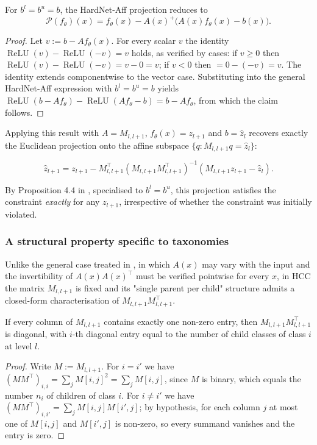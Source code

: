 \begin{proposition}
For $b^l=b^u=b$, the HardNet-Aff projection reduces to
\[
\mathcal{P}(f_\theta)(x)=f_\theta(x)-A(x)^{+}\big(A(x)f_\theta(x)-b(x)\big).
\]
\end{proposition}
\begin{proof}
Let $v:=b-Af_\theta(x)$. For every scalar $v$ the identity $\operatorname{ReLU}(v)-\operatorname{ReLU}(-v)=v$ holds, as verified by cases: if $v\ge 0$ then $\operatorname{ReLU}(v)-\operatorname{ReLU}(-v)=v-0=v$; if $v<0$ then $=0-(-v)=v$. The identity extends componentwise to the vector case. Substituting into the general HardNet-Aff expression with $b^l=b^u=b$ yields $\operatorname{ReLU}(b-Af_\theta)-\operatorname{ReLU}(Af_\theta-b)=b-Af_\theta$, from which the claim follows.
\end{proof}

Applying this result with $A=M_{l,l+1}$, $f_\theta(x)=z_{l+1}$ and $b=\hat z_l$ recovers exactly the Euclidean projection onto the affine subspace $\{q:M_{l,l+1}q=\hat z_l\}$:

\[
\hat z_{l+1}
=
z_{l+1}
-
M_{l,l+1}^{\top}
\left(
M_{l,l+1}M_{l,l+1}^{\top}
\right)^{-1}
\left(
M_{l,l+1}z_{l+1}-\hat z_l
\right).
\]

By Proposition 4.4 in \cite{min2024hardnet}, specialised to $b^l=b^u$, this projection satisfies the constraint \emph{exactly} for any $z_{l+1}$, irrespective of whether the constraint was initially violated.

\subsubsection{A structural property specific to taxonomies}

Unlike the general case treated in \cite{min2024hardnet}, in which $A(x)$ may vary with the input and the invertibility of $A(x)A(x)^{\top}$ must be verified pointwise for every $x$, in HCC the matrix $M_{l,l+1}$ is fixed and its "single parent per child" structure admits a closed-form characterisation of $M_{l,l+1}M_{l,l+1}^{\top}$.

\begin{lemma}
\label{lemma:diag}
If every column of $M_{l,l+1}$ contains exactly one non-zero entry, then $M_{l,l+1}M_{l,l+1}^{\top}$ is diagonal, with $i$-th diagonal entry equal to the number of child classes of class $i$ at level $l$.
\end{lemma}
\begin{proof}
Write $M:=M_{l,l+1}$. For $i=i'$ we have $(MM^\top)_{i,i}=\sum_j M[i,j]^2=\sum_j M[i,j]$, since $M$ is binary, which equals the number $n_i$ of children of class $i$. For $i\ne i'$ we have $(MM^\top)_{i,i'}=\sum_j M[i,j]M[i',j]$; by hypothesis, for each column $j$ at most one of $M[i,j]$ and $M[i',j]$ is non-zero, so every summand vanishes and the entry is zero.
\end{proof}

